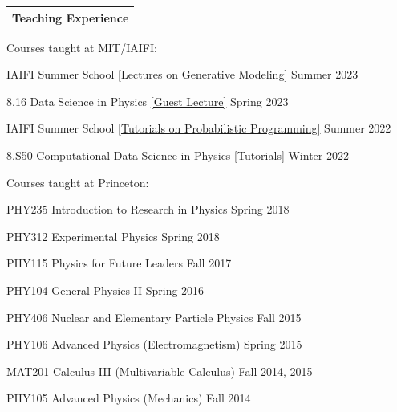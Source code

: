 \documentclass[letterpaper,11pt]{article}
\newenvironment{packed_itemize}{
\begin{itemize}[label=\raisebox{0.25ex}{\tiny$\bullet$}]
  \setlength{\itemsep}{4.2pt}
  \setlength{\parskip}{0pt}
  \setlength{\parsep}{0pt}}{\end{itemize}
}
\begin{document}


\noindent
\begin{tabular*}{\textwidth}{l@{\extracolsep{\fill}}}
\large {\sc \Large{Teaching Experience}}\\
\hline
\end{tabular*}\vspace{3.5mm}

\noindent
Courses taught at MIT/IAIFI:
\begin{packed_itemize}
  \item IAIFI Summer School \href{https://smsharma.io/iaifi-summer-school-2023/}{[Lectures on Generative Modeling]} \hfill Summer 2023
  \item 8.16 Data Science in Physics \href{https://github.com/smsharma/sbi-lecture-mit}{[Guest Lecture]} \hfill Spring 2023
  \item IAIFI Summer School \href{https://github.com/smsharma/iaifi-summer-school-tutorials}{[Tutorials on Probabilistic Programming]} \hfill Summer 2022
  \item 8.S50 Computational Data Science in Physics \href{https://github.com/smsharma/prob-prog-8.S50-tutorial}{[Tutorials]} \hfill Winter 2022
\end{packed_itemize}

\noindent
Courses taught at Princeton:
\begin{packed_itemize}
  \item PHY235 Introduction to Research in Physics \hfill Spring 2018
  \item PHY312 Experimental Physics \hfill Spring 2018
  \item PHY115  Physics for Future Leaders \hfill Fall 2017
  \item PHY104  General Physics II \hfill Spring 2016
  \item PHY406 Nuclear and Elementary Particle Physics \hfill Fall 2015
  \item PHY106 Advanced Physics (Electromagnetism) \hfill Spring 2015
  \item MAT201 Calculus III (Multivariable Calculus) \hfill Fall 2014, 2015
  \item PHY105 Advanced Physics (Mechanics) \hfill Fall 2014
\end{packed_itemize}
\vspace{2.0mm}

\end{document}
